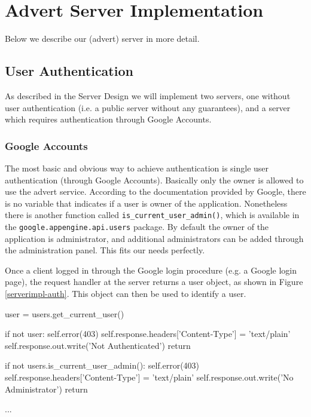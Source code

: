 \section{Advert Server Implementation}
\label{serverimpl}
Below we describe our (advert) server in more detail.

\subsection{User Authentication}
As described in the Server Design we will implement two servers, one without user
authentication (i.e. a public server without any guarantees), and a server which
requires authentication through Google Accounts.

\subsubsection{Google Accounts}
The most basic and obvious way to achieve authentication is single user
authentication (through Google Accounts). Basically only the owner is allowed to
use the advert service. According to the documentation provided by Google, there
is no variable that indicates if a user is owner of the application. Nonetheless
there is another function called \texttt{is\_current\_user\_admin()}, which is
available in the \texttt{google.appengine.api.users} package. By default the
owner of the application is administrator, and additional administrators can be
added through the administration panel. This fits our needs perfectly.

Once a client logged in through the Google login procedure (e.g. a Google login
page), the request handler at the server returns a user object, as shown in
Figure \ref{serverimpl-auth}. This object can then be used to identify a
user.

\begin{figure*}[ht] %
\begin{center}
\begin{code}
user   = users.get_current_user()

if not user:
    self.error(403)
    self.response.headers['Content-Type'] = 'text/plain'
    self.response.out.write('Not Authenticated')
    return

if not users.is_current_user_admin():
    self.error(403)
    self.response.headers['Content-Type'] = 'text/plain'
    self.response.out.write('No Administrator')
    return
    
...
\end{code}
\caption{Authenticating a User.\label{serverimpl-auth}}
\end{center}
\end{figure*}

